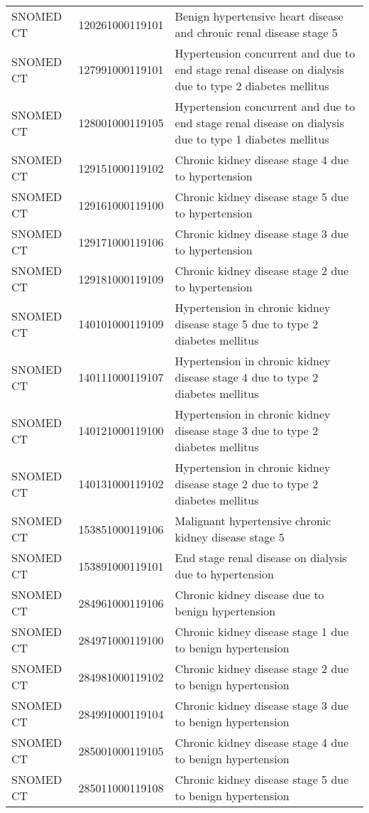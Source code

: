 \begin{longtable}{p{}p{}p{}}
  SNOMED CT & 120261000119101 & Benign hypertensive heart disease and chronic renal disease stage 5 \\ 
  SNOMED CT & 127991000119101 & Hypertension concurrent and due to end stage renal disease on dialysis due to type 2 diabetes mellitus \\ 
  SNOMED CT & 128001000119105 & Hypertension concurrent and due to end stage renal disease on dialysis due to type 1 diabetes mellitus \\ 
  SNOMED CT & 129151000119102 & Chronic kidney disease stage 4 due to hypertension \\ 
  SNOMED CT & 129161000119100 & Chronic kidney disease stage 5 due to hypertension \\ 
  SNOMED CT & 129171000119106 & Chronic kidney disease stage 3 due to hypertension \\ 
  SNOMED CT & 129181000119109 & Chronic kidney disease stage 2 due to hypertension \\ 
  SNOMED CT & 140101000119109 & Hypertension in chronic kidney disease stage 5 due to type 2 diabetes mellitus \\ 
  SNOMED CT & 140111000119107 & Hypertension in chronic kidney disease stage 4 due to type 2 diabetes mellitus \\ 
  SNOMED CT & 140121000119100 & Hypertension in chronic kidney disease stage 3 due to type 2 diabetes mellitus \\ 
  SNOMED CT & 140131000119102 & Hypertension in chronic kidney disease stage 2 due to type 2 diabetes mellitus \\ 
  SNOMED CT & 153851000119106 & Malignant hypertensive chronic kidney disease stage 5 \\ 
  SNOMED CT & 153891000119101 & End stage renal disease on dialysis due to hypertension \\ 
  SNOMED CT & 284961000119106 & Chronic kidney disease due to benign hypertension \\ 
  SNOMED CT & 284971000119100 & Chronic kidney disease stage 1 due to benign hypertension \\ 
  SNOMED CT & 284981000119102 & Chronic kidney disease stage 2 due to benign hypertension \\ 
  SNOMED CT & 284991000119104 & Chronic kidney disease stage 3 due to benign hypertension \\ 
  SNOMED CT & 285001000119105 & Chronic kidney disease stage 4 due to benign hypertension \\ 
  SNOMED CT & 285011000119108 & Chronic kidney disease stage 5 due to benign hypertension \\ 

\end{longtable}
